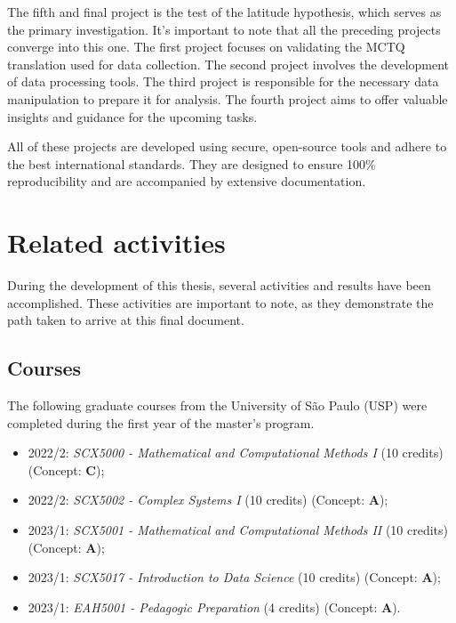 \documentclass[
12pt,
openright,
oneside,
a4paper,
chapter=TITLE,
section=TITLE,
french,
spanish,
brazil,
english
]{abntex2}\usepackage{array}
\begin{document}
The fifth and final project is the test of the latitude hypothesis,
which serves as the primary investigation. It's important to note that
all the preceding projects converge into this one. The first project
focuses on validating the MCTQ translation used for data collection. The
second project involves the development of data processing tools. The
third project is responsible for the necessary data manipulation to
prepare it for analysis. The fourth project aims to offer valuable
insights and guidance for the upcoming tasks.

All of these projects are developed using secure, open-source tools and
adhere to the best international standards. They are designed to ensure
100\% reproducibility and are accompanied by extensive documentation.

\section{Related activities}\label{related-activities}

During the development of this thesis, several activities and results
have been accomplished. These activities are important to note, as they
demonstrate the path taken to arrive at this final document.

\subsection{Courses}\label{courses}

The following graduate courses from the University of São Paulo (USP)
were completed during the first year of the master's program.

\begin{itemize}
\tightlist
\item
  2022/2: \emph{SCX5000 - Mathematical and Computational Methods I} (10
  credits) (Concept: \textbf{C});
\item
  2022/2: \emph{SCX5002 - Complex Systems I} (10 credits) (Concept:
  \textbf{A});
\item
  2023/1: \emph{SCX5001 - Mathematical and Computational Methods II} (10
  credits) (Concept: \textbf{A});
\item
  2023/1: \emph{SCX5017 - Introduction to Data Science} (10 credits)
  (Concept: \textbf{A});
\item
  2023/1: \emph{EAH5001 - Pedagogic Preparation} (4 credits) (Concept:
  \textbf{A}).
\end{itemize}
\end{document}
